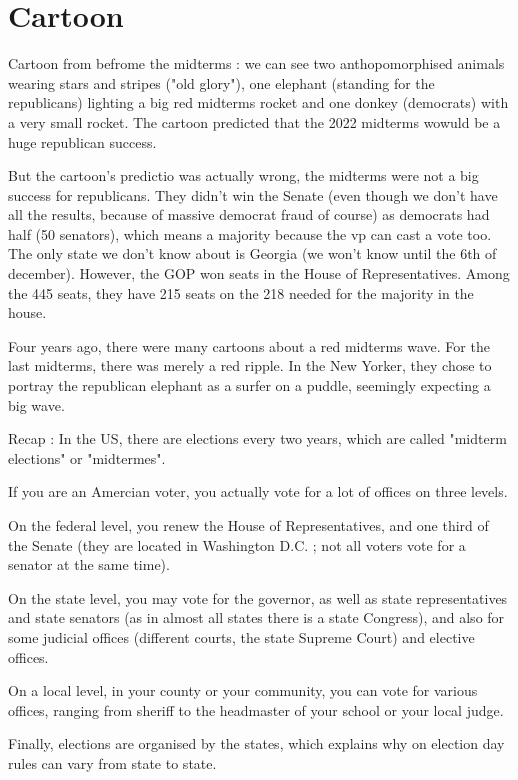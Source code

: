 \documentclass[a4paper,12pt]{book}
\begin{document}
\section{Cartoon}
Cartoon from befrome the midterms : we can see two anthopomorphised animals wearing stars and stripes ("old glory"), one elephant (standing for the republicans) lighting a big red midterms rocket and one donkey (democrats) with a very small rocket. The cartoon predicted that the 2022 midterms wowuld be a huge republican success.
\par But the cartoon's predictio was actually wrong, the midterms were not a big success for republicans. They didn't win the Senate (even though we don't have all the results, because of massive democrat fraud of course) as democrats had half (50 senators), which means a majority because the vp can cast a vote too. The only state we don't know about is Georgia (we won't know until the 6th of december). However, the GOP won seats in the House of Representatives. Among the 445 seats, they have 215 seats on the 218 needed for the majority in the house.
\par Four years ago, there were many cartoons about a red midterms wave. For the last midterms, there was merely a red ripple. In the New Yorker, they chose to portray the republican elephant as a surfer on a puddle, seemingly expecting a big wave.  
\par Recap : In the US, there are elections every two years, which are called "midterm elections" or "midtermes". \par If you are an Amercian voter, you actually vote for a lot of offices on three levels. \par On the federal level, you renew the House of Representatives, and one third of the Senate (they are located in Washington D.C. ; not all voters vote for a senator at the same time). \par On the state level, you may vote for the governor, as well as state representatives and state senators (as in almost all states there is a state Congress), and also for some judicial offices (different courts, the state Supreme Court) and elective offices. \par On a local level, in your county or your community, you can vote for various offices, ranging from sheriff to the headmaster of your school or your local judge. \par Finally, elections are organised by the states, which explains why on election day rules can vary from state to state.
\end{document}
